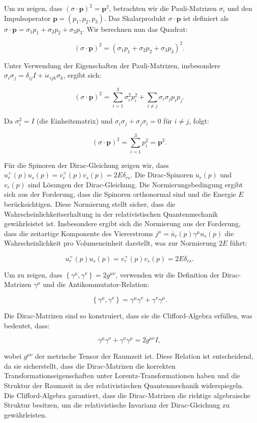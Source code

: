 Um zu zeigen, dass $(\sigma \cdot \mathbf{p})^2 = \mathbf{p}^2$, betrachten wir die Pauli-Matrizen $\sigma_i$ und den Impulsoperator $\mathbf{p} = (p_1, p_2, p_3)$. Das Skalarprodukt $\sigma \cdot \mathbf{p}$ ist definiert als $\sigma \cdot \mathbf{p} = \sigma_1 p_1 + \sigma_2 p_2 + \sigma_3 p_3$. Wir berechnen nun das Quadrat:

\[
(\sigma \cdot \mathbf{p})^2 = (\sigma_1 p_1 + \sigma_2 p_2 + \sigma_3 p_3)^2.
\]

Unter Verwendung der Eigenschaften der Pauli-Matrizen, insbesondere $\sigma_i \sigma_j = \delta_{ij} I + i \epsilon_{ijk} \sigma_k$, ergibt sich:

\[
(\sigma \cdot \mathbf{p})^2 = \sum_{i=1}^{3} \sigma_i^2 p_i^2 + \sum_{i \neq j} \sigma_i \sigma_j p_i p_j.
\]

Da $\sigma_i^2 = I$ (die Einheitsmatrix) und $\sigma_i \sigma_j + \sigma_j \sigma_i = 0$ für $i \neq j$, folgt:

\[
(\sigma \cdot \mathbf{p})^2 = \sum_{i=1}^{3} p_i^2 = \mathbf{p}^2.
\]

Für die Spinoren der Dirac-Gleichung zeigen wir, dass $u_r^{+}(p) u_s(p) = v_r^{+}(p) v_s(p) = 2 E \delta_{rs}$. Die Dirac-Spinoren $u_r(p)$ und $v_r(p)$ sind Lösungen der Dirac-Gleichung. Die Normierungsbedingung ergibt sich aus der Forderung, dass die Spinoren orthonormal sind und die Energie $E$ berücksichtigen. Diese Normierung stellt sicher, dass die Wahrscheinlichkeitserhaltung in der relativistischen Quantenmechanik gewährleistet ist. Insbesondere ergibt sich die Normierung aus der Forderung, dass die zeitartige Komponente des Viererstroms $j^\mu = \bar{u}_r(p) \gamma^\mu u_s(p)$ die Wahrscheinlichkeit pro Volumeneinheit darstellt, was zur Normierung $2E$ führt:

\[
u_r^{+}(p) u_s(p) = v_r^{+}(p) v_s(p) = 2 E \delta_{rs}.
\]

Um zu zeigen, dass $\left\{\gamma^\mu, \gamma^\nu\right\} = 2 g^{\mu \nu}$, verwenden wir die Definition der Dirac-Matrizen $\gamma^\mu$ und die Antikommutator-Relation:

\[
\left\{\gamma^\mu, \gamma^\nu\right\} = \gamma^\mu \gamma^\nu + \gamma^\nu \gamma^\mu.
\]

Die Dirac-Matrizen sind so konstruiert, dass sie die Clifford-Algebra erfüllen, was bedeutet, dass:

\[
\gamma^\mu \gamma^\nu + \gamma^\nu \gamma^\mu = 2 g^{\mu \nu} I,
\]

wobei $g^{\mu \nu}$ der metrische Tensor der Raumzeit ist. Diese Relation ist entscheidend, da sie sicherstellt, dass die Dirac-Matrizen die korrekten Transformationseigenschaften unter Lorentz-Transformationen haben und die Struktur der Raumzeit in der relativistischen Quantenmechanik widerspiegeln. Die Clifford-Algebra garantiert, dass die Dirac-Matrizen die richtige algebraische Struktur besitzen, um die relativistische Invarianz der Dirac-Gleichung zu gewährleisten.